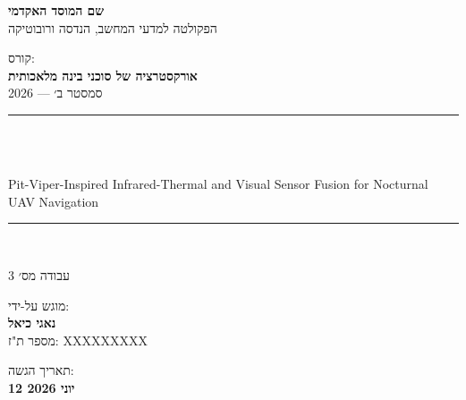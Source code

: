 \begin{titlepage}
    \centering
    \vspace*{1.5cm}

    {\large\textbf{שם המוסד האקדמי}}\\
    \vspace{0.3em}
    {\normalsize הפקולטה למדעי המחשב, הנדסה ורובוטיקה}\\
    \vspace{1.5cm}

    {\normalsize קורס:}\\
    \vspace{0.2em}
    {\large\textbf{אורקסטרציה של סוכני בינה מלאכותית}}\\
    \vspace{0.2em}
    {\normalsize סמסטר ב׳ --- 2026}\\
    \vspace{1.5cm}

    \rule{\linewidth}{1pt}\\
    \vspace{0.5cm}

    {\LARGE\bfseries {}}\\
    \vspace{0.4em}
    {\large\foreignlanguage{english}{Pit-Viper-Inspired Infrared-Thermal and Visual Sensor Fusion for Nocturnal UAV Navigation}}\\
    \vspace{0.3em}

    \rule{\linewidth}{1pt}\\
    \vspace{1.5cm}

    {\large עבודה מס׳ 3}\\
    \vspace{2cm}

    {\normalsize מוגש על-ידי:}\\
    \vspace{0.5em}
    {\large\textbf{נאגי כיאל}}\\
    \vspace{0.2em}
    {\normalsize מספר ת"ז: XXXXXXXXX}\\
    \vspace{1cm}

    \vfill
    {\normalsize תאריך הגשה:}\\
    \vspace{0.2em}
    {\large\textbf{12 יוני 2026}}\\
    \vspace{1cm}
\end{titlepage}
